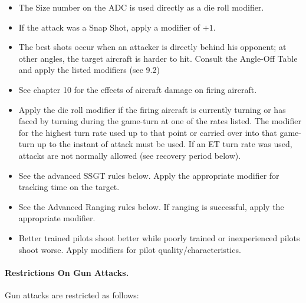 \begin{itemize}

    \item{} The Size number on the ADC is used directly as a die roll modifier.

    \item{} If the attack was a Snap Shot, apply a modifier of $+1$.

    \item{} The best shots occur when an attacker is directly behind his opponent; at other angles, the target aircraft is harder to hit. Consult the Angle-Off Table and apply the listed modifiers (see 9.2)


    \item{} See chapter 10 for the effects of aircraft damage on firing aircraft.

    \item{} Apply the die roll modifier if the firing aircraft is currently turning or has faced by turning during the game-turn at one of the rates listed. The modifier for the highest turn rate used up to that point or carried over into that game-turn up to the instant of attack must be used. If an ET turn rate was used, attacks are not normally allowed (see recovery period below).

    \item{} See the advanced SSGT rules below. Apply the appropriate modifier for tracking time on the target.

    \item{} See the Advanced Ranging rules below. If ranging is successful, apply the appropriate modifier.

    \item{} Better trained pilots shoot better while poorly trained or inexperienced pilots shoot worse. Apply modifiers for pilot quality/characteristics.

\end{itemize}

\paragraph{Restrictions On Gun Attacks.} Gun attacks are restricted as follows:

